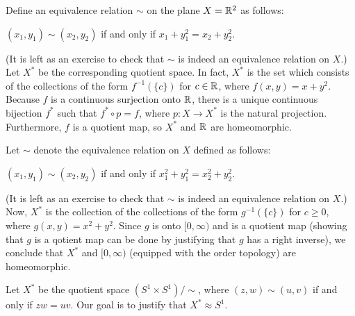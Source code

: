 \begin{exmp}
    Define an equivalence relation $\sim$ on the plane $X={\mathbb{R}}^2$ as follows:
    \begin{center}
        $(x_1, y_1)\sim(x_2, y_2)$ if and only if $x_1+y_1^2=x_2+y_2^2$.
    \end{center}
    \color{brown}(It is left as an exercise to check that $\sim$ is indeed an equivalence relation on $X$.) \color{black}
    Let $X^*$ be the corresponding quotient space.
    In fact, $X^*$ is the set which consists of the collections of the form $f^{-1}(\{c\})$ for $c\in{\mathbb{R}}$, where $f(x, y)=x+y^2$.
    Because $f$ is a continuous surjection onto ${\mathbb{R}}$, there is a unique continuous bijection $f^*$ such that $f^*\circ p=f$, where $p: X\rightarrow X^*$ is the natural projection.
    Furthermore, $f$ is a quotient map, so $X^*$ and ${\mathbb{R}}$ are homeomorphic.

    Let $\sim$ denote the equivalence relation on $X$ defined as follows:
    \begin{center}
        $(x_1, y_1)\sim(x_2, y_2)$ if and only if $x_1^2+y_1^2=x_2^2+y_2^2$.
    \end{center}
    \color{brown}(It is left as an exercise to check that $\sim$ is indeed an equivalence relation on $X$.) \color{black}
    Now, $X^*$ is the collection of the collections of the form $g^{-1}(\{c\})$ for $c\geq 0$, where $g(x, y)=x^2+y^2$.
    Since $g$ is onto $[0, \infty)$ and is a quotient map \color{red}(showing that $g$ is a qotient map can be done by justifying that $g$ has a right inverse)\color{black}, we conclude that $X^*$ and $[0, \infty)$ (equipped with the order topology) are homeomorphic.
\end{exmp}
\begin{exmp}
    Let $X^*$ be the quotient space $(S^1\times S^1)/\sim$, where $(z, w)\sim(u, v)$ if and only if $zw=uv$.
    Our goal is to justify that $X^*\approx S^1$.
\end{exmp}


